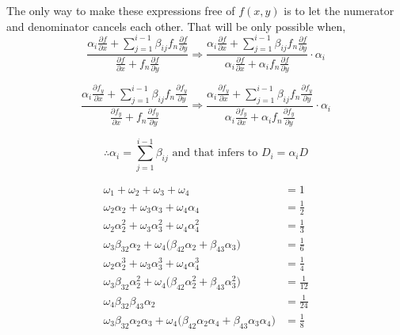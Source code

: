 \documentclass[12 pt]{article}
\begin{document}
The only way to make these expressions free of $f(x,y)$ is to let the numerator and denominator cancels each other. That will be only possible when, $$\frac{\alpha_{i}\frac{\partial f}{\partial x} + \sum_{j=1}^{i-1}\beta_{ij}f_{n}\frac{\partial f}{\partial y}}{\frac{\partial f}{\partial x} + f_{n}\frac{\partial f}{\partial y}}\Rightarrow \frac{\alpha_{i}\frac{\partial f}{\partial x} + \sum_{j=1}^{i-1}\beta_{ij}f_{n}\frac{\partial f}{\partial y}}{\alpha_{i}\frac{\partial f}{\partial x} + \alpha_{i}f_{n}\frac{\partial f}{\partial y}}\cdot\alpha_{i}$$

$$\frac{\alpha_{i}\frac{\partial f_{y}}{\partial x} + \sum_{j=1}^{i-1}\beta_{ij}f_{n}\frac{\partial f_{y}}{\partial y}}{\frac{\partial f_{y}}{\partial x} + f_{n}\frac{\partial f_{y}}{\partial y}}\Rightarrow \frac{\alpha_{i}\frac{\partial f_{y}}{\partial x} + \sum_{j=1}^{i-1}\beta_{ij}f_{n}\frac{\partial f_{y}}{\partial y}}{\alpha_{i}\frac{\partial f_{y}}{\partial x} + \alpha_{i}f_{n}\frac{\partial f_{y}}{\partial y}}\cdot\alpha_{i}$$

$$\therefore \alpha_{i} = \sum_{j=1}^{i-1}\beta_{ij} \text{ and that infers to  } D_{i}=\alpha_{i} D$$

\begin{align*}
\omega_{1} + \omega_{2} + \omega_{3} + \omega_{4} &= 1\\
\omega_{2}\alpha_{2} + \omega_{3}\alpha_{3} + \omega_{4}\alpha_{4} &= \frac{1}{2}\\
\omega_{2}\alpha_{2}^{2} + \omega_{3}\alpha_{3}^{2} + \omega_{4}\alpha_{4}^{2} &= \frac{1}{3}\\
\omega_{3}\beta_{32}\alpha_{2} + \omega_{4}\bigg(\beta_{42}\alpha_{2} + 
\beta_{43}\alpha_{3}\bigg) &= \frac{1}{6}\\
\omega_{2}\alpha_{2}^{3} + 
\omega_{3}\alpha_{3}^{3} + 
\omega_{4}\alpha_{4}^{3} &= \frac{1}{4}\\
\omega_{3}\beta_{32}\alpha_{2}^{2} + \omega_{4}\bigg(\beta_{42}\alpha_{2}^{2} +
\beta_{43}\alpha_{3}^{2}\bigg) &= \frac{1}{12}\\
\omega_{4}\beta_{32}\beta_{43}\alpha_{2} &= \frac{1}{24}\\
\omega_{3}\beta_{32}\alpha_{2}\alpha_{3}+ 
\omega_{4}\bigg(\beta_{42}\alpha_{2}\alpha_{4} + 
\beta_{43}\alpha_{3}\alpha_{4}\bigg) &= \frac{1}{8}
\end{align*}
\end{document}
